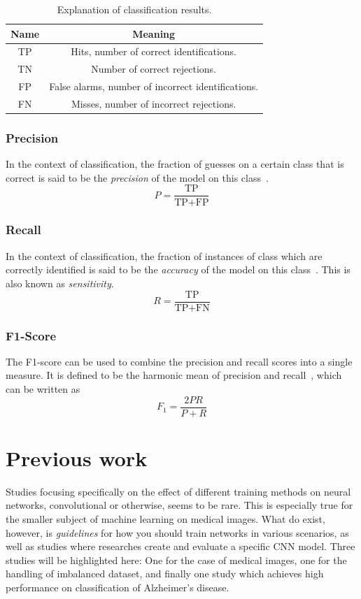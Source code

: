 \documentclass{kththesis}
\begin{document}
\begin{table}[H]
  \begin{center}
    \begin{tabular}{cc}
      \textbf{Name} & \textbf{Meaning} \\
      \toprule
      TP & Hits, number of correct identifications. \\
      TN & Number of correct rejections. \\
      FP & False alarms, number of incorrect identifications. \\
      FN & Misses, number of incorrect rejections.
    \end{tabular}
  \end{center}
  \caption{Explanation of classification results.}
  \label{tab:tp_mm}
\end{table}

\subsubsection{Precision}
In the context of classification, the fraction of guesses on a certain class that is correct is said to be the \textit{precision} of the model on this class~\cite[p.~5]{irbook}.
\[ P = \frac{\text{TP}}{\text{TP} + \text{FP}} \]

\subsubsection{Recall}
In the context of classification, the fraction of instances of class which are correctly identified is said to be the \textit{accuracy} of the model on this class~\cite[p.~5]{irbook}. This is also known as \textit{sensitivity}.
\[ R = \frac{\text{TP}}{\text{TP} + \text{FN}} \]

\subsubsection{F1-Score}
The F1-score can be used to combine the precision and recall scores into a single measure. It is defined to be the harmonic mean of precision and recall~\cite[p.~156-167]{irbook}, which can be written as
\[ F_1 = \frac{2PR}{P + R} \]

\section{Previous work}
Studies focusing specifically on the effect of different training methods on neural networks, convolutional or otherwise, seems to be rare. This is especially true for the smaller subject of machine learning on medical images.
What do exist, however, is \textit{guidelines} for how you should train networks in various scenarios, as well as studies where researches create and evaluate a specific CNN model. Three studies will be highlighted here: One for the case of medical images, one for the handling of imbalanced dataset, and finally one study which achieves high performance on classification of Alzheimer's disease.
\end{document}
